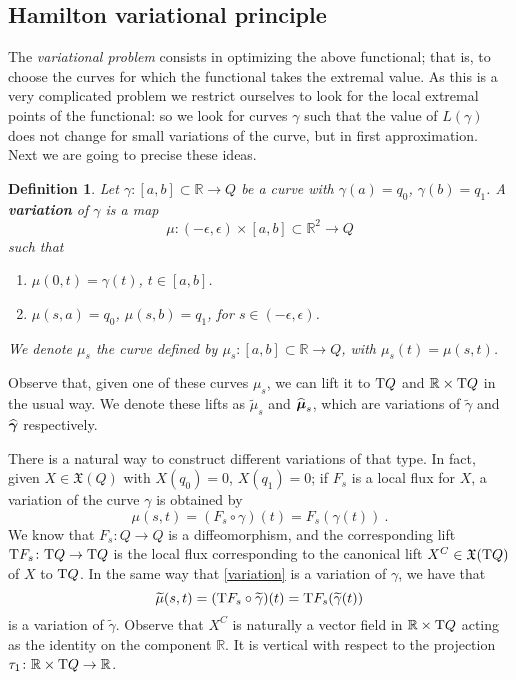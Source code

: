 \documentclass[12pt]{report}
\newtheorem{definition}[teor]{Definition}
\def\beq{\begin{equation}}
\def\eeq{\end{equation}}
\def\vf{\mathfrak X}
\def\Real{\mathbb{R}}
\def\Tan{{\rm T}}
\begin{document}
\subsection{Hamilton variational principle}


The {\sl variational problem} consists in optimizing the above functional;
that is, to choose the curves for which the functional takes the extremal value. 
As this is a very complicated problem we restrict ourselves to look for the local extremal points of the functional: 
so we look for curves $\gamma$ such that the value of 
$L(\gamma)$ does not change for small variations of the curve,
but in first approximation. Next we are going to precise these ideas.

\begin{definition}
Let $\gamma \colon [a,b]\subset\Real \to Q$ be a curve with
$\gamma (a)=q_0$, $\gamma (b)=q_1$.
A \textbf{variation} of $\gamma$ is a map
$$
\mu \colon (-\epsilon ,\epsilon )\times [a,b]\subset\Real^2 \to Q
$$
such that
\begin{enumerate}
\item
$\mu (0,t)=\gamma (t)$, $t\in [a,b]$.
\item
$\mu (s,a)=q_0$, $\mu (s,b)=q_1$, for $s\in (-\epsilon ,\epsilon )$.
\end{enumerate}
We denote $\mu_s$ the curve defined by
$\mu_s \colon [a,b]\subset\Real \to Q$, with $\mu_s(t)=\mu (s,t)$.
\end{definition}

Observe that, given one of these curves  $\mu_s$, we can lift it to $\Tan Q$ and $\Real\times\Tan Q$ in the usual way.
We denote these lifts as $\widetilde \mu_s$ and $\widehat{\mbox{\boldmath$\mu$}}_s$, which are variations of $\widetilde\gamma$ and $\widehat{\mbox{\boldmath$\gamma$}}$ respectively.

There is a natural way to construct different variations of that type.
In fact, given $X \in \vf(Q)$ with
$X(q_0)=0$, $X(q_1)=0$; if $F_s$ is a local flux for $X$,
a variation of the curve $\gamma$ is obtained by
\beq
\label{variation}
\mu (s,t)=(F_s\circ\gamma)(t)=F_s(\gamma (t)) \ .
\eeq
We know that $F_s \colon Q \to Q$
is a diffeomorphism, and the corresponding lift
$\Tan F_s \colon \Tan Q \to \Tan Q$ is the local flux corresponding to the canonical lift $X^C\in \vf(\Tan Q)$ of $X$ to $\Tan Q$.
In the same way that \eqref{variation} is a variation of $\gamma$, 
we have that 
$$
\widetilde{\mu} (s,t)=(\Tan F_s\circ\widetilde\gamma)(t)=\Tan F_s(\widetilde\gamma (t))
$$
is a variation of $\widetilde\gamma$. 
Observe that $X^C$ is naturally a vector field in $\Real\times\Tan Q$ acting as the identity on the component $\Real$.
It is vertical with respect to the projection $\tau_1\colon\Real\times\Tan Q\to\Real$.
\end{document}
